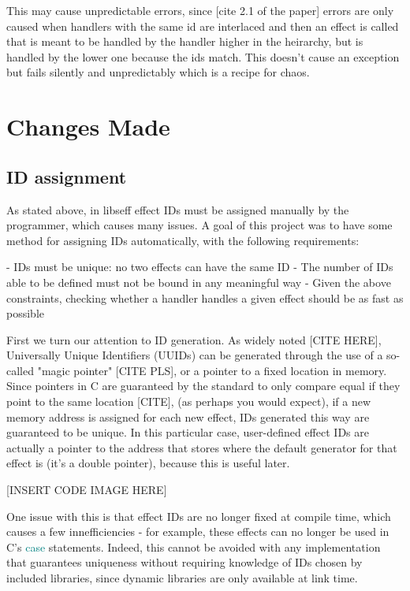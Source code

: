 \documentclass[logo,bsc,singlespacing,parskip,online]{infthesis}
\begin{document}
This may cause unpredictable errors, since [cite 2.1 of the paper] errors are only caused when handlers with the same id are interlaced and then an effect is called that is meant to be handled by the handler higher in the heirarchy, but is handled by the lower one because the ids match. This doesn't cause an exception but fails silently and unpredictably which is a recipe for chaos. %

\chapter{Changes Made}

\section{ID assignment}

As stated above, in libseff effect IDs must be assigned manually by the programmer, which causes many issues. A goal of this project was to have some method for assigning IDs automatically, with the following requirements:

 - IDs must be unique: no two effects can have the same ID
 - The number of IDs able to be defined must not be bound in any meaningful way
 - Given the above constraints, checking whether a handler handles a given effect should be as fast as possible

First we turn our attention to ID generation. As widely noted [CITE HERE], Universally Unique Identifiers (UUIDs) can be generated through the use of a so-called "magic pointer" [CITE PLS], or a pointer to a fixed location in memory. Since pointers in C are guaranteed by the standard to only compare equal if they point to the same location [CITE], (as perhaps you would expect), if a new memory address is assigned for each new effect, IDs generated this way are guaranteed to be unique. In this particular case, user-defined effect IDs are actually a pointer to the address that stores where the default generator for that effect is (it's a double pointer), because this is useful later.

[INSERT CODE IMAGE HERE]

One issue with this is that effect IDs are no longer fixed at compile time, which causes a few innefficiencies - for example, these effects can no longer be used in C's \textcolor{teal}{case} statements. Indeed, this cannot be avoided with any implementation that guarantees uniqueness without requiring knowledge of IDs chosen by included libraries, since dynamic libraries are only available at link time.
\end{document}
